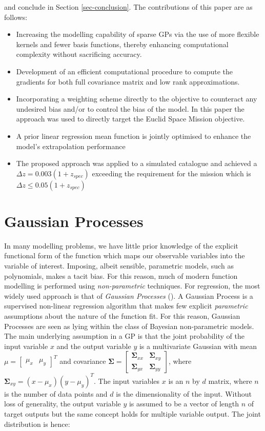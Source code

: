 \documentclass[useAMS,usenatbib,fleqn]{mn2e}
\newcommand{\bm}[1]{\mathbf{#1} }
\begin{document}
and conclude in Section \ref{sec-conclusion}. The contributions of this paper are as follows:

\begin{itemize}
  \item Increasing the modelling capability of sparse GPs via the use of more flexible kernels and fewer basis functions, thereby enhancing computational complexity without sacrificing accuracy.
  \item Development of an efficient computational procedure to compute the gradients for both full covariance matrix and low rank approximations.
  \item Incorporating a weighting scheme directly to the objective to counteract any undesired bias and/or to control the bias of the model. In this paper the approach was used to directly target the Euclid Space Mission objective.
  \item A prior linear regression mean function is jointly optimised to enhance the model's extrapolation performance
  \item The proposed approach was applied to a simulated catalogue and achieved  a $\Delta z = 0.003(1+z_{spec})$ exceeding the requirement for the mission which is $\Delta z \le 0.05(1+z_{spec})$
\end{itemize}

\section{Gaussian Processes}
\label{sec-gaussian-process}
In many modelling problems, we have little prior knowledge of the explicit functional form of the function which maps our observable variables into the variable of interest. Imposing, albeit sensible, parametric models, such as polynomials, makes a tacit bias. For this reason, much of modern function modelling is performed using \emph{non-parametric} techniques. For regression, the most widely used approach is that of \emph{Gaussian Processes} (\citep{rasmussen2006gaussian}).
A Gaussian Process is a supervised non-linear regression algorithm that makes few explicit \emph{parametric} assumptions about the nature of the function fit. For this reason, Gaussian Processes are seen as lying within the class of Bayesian non-parametric models. The main underlying assumption in a GP is that the joint probability of the input variable $x$ and the output variable $y$ is a multivariate Gaussian with mean $\mu=\begin{bmatrix} \mu_{x} & \mu_{y}\end{bmatrix}^{T}$ and covariance $\bm{\Sigma}=\begin{bmatrix}\bm{\Sigma}_{xx} & \bm{\Sigma}_{xy}\\\bm{\Sigma}_{yx} & \bm{\Sigma}_{yy} \end{bmatrix}$, where $\bm{\Sigma}_{xy}=(x-\mu_{x})(y-\mu_{y})^{T}$. The input variables $x$ is an $n$ by $d$ matrix, where $n$ is the number of data points and $d$ is the dimensionality of the input. Without loss of generality, the output variable $y$ is assumed to be a vector of length $n$ of target outputs but the same concept holds for multiple variable output. The joint distribution is hence:
\end{document}
